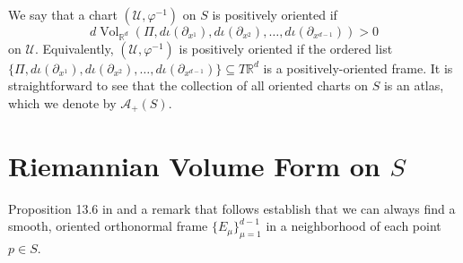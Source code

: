 \documentclass{article}
\theoremstyle{theorem}
\newtheorem{proposition}[theorem]{Proposition}
\newcommand{\Vol}{\operatorname{Vol}}
\begin{document}
We say that a chart $(\mathcal{U},\varphi^{-1})$ on $S$ is positively oriented if 
\begin{equation*}
d\Vol_{\mathbb{R}^d}(\Pi,d\iota(\partial_{x^1}),d\iota(\partial_{x^2}),\dots,d\iota(\partial_{x^{d-1}}))>0
\end{equation*}
on $\mathcal{U}$. Equivalently, $(\mathcal{U},\varphi^{-1})$ is positively oriented if the ordered list $\{\Pi,d\iota(\partial_{x^1}),d\iota(\partial_{x^2}),\dots,d\iota(\partial_{x^{d-1}})\}\subseteq T\mathbb{R}^d$ is a positively-oriented frame. It is straightforward to see that the collection of all oriented charts on $S$ is an atlas, which we denote by $\mathcal{A}_+(S)$.



\section{Riemannian Volume Form on $S$}

Proposition 13.6 in \cite{lee2013smooth} and a remark that follows establish that we can always find a smooth, oriented orthonormal frame $\{ E_\mu \}_{\mu = 1}^{d-1}$ in a neighborhood of each point  $p\in S$. 
\end{document}
